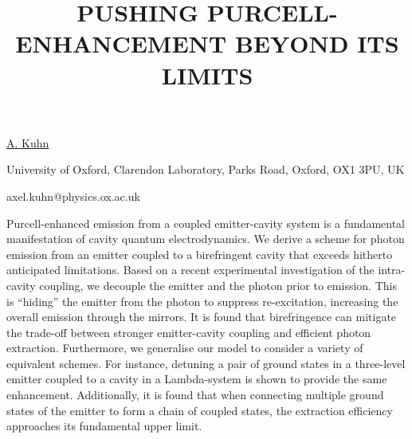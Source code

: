 \title{PUSHING PURCELL-ENHANCEMENT BEYOND ITS LIMITS}

\underline{A. Kuhn}  

{\normalsize{\vspace{-4mm}
University of Oxford,
Clarendon Laboratory,
Parks Road,
Oxford,
OX1 3PU, UK



\email axel.kuhn@physics.ox.ac.uk}}

Purcell-enhanced emission from a coupled emitter-cavity system is a fundamental manifestation of cavity quantum electrodynamics. We derive a scheme for photon emission from an emitter coupled to a birefringent cavity that exceeds hitherto anticipated limitations. Based on a recent experimental investigation of the intra-cavity coupling, we decouple the emitter and the photon prior to emission. This is ``hiding'' the emitter from the photon to suppress re-excitation, increasing the overall emission through the mirrors. It is found that birefringence can mitigate the trade-off between stronger emitter-cavity coupling and efficient photon extraction. Furthermore, we generalise our model to consider a variety of equivalent schemes. For instance, detuning a pair of ground states in a three-level emitter coupled to a cavity in a Lambda-system is shown to provide the same enhancement. Additionally, it is found that when connecting multiple ground states of the emitter to form a chain of coupled states, the extraction efficiency approaches its fundamental upper limit.

\vspace{\baselineskip}